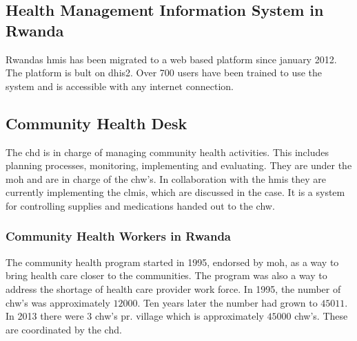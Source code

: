 \subsection{Health Management Information System in Rwanda}
Rwandas \gls{hmis} has been migrated to a web based platform since january 2012.
The platform is bult on \gls{dhis2}.
Over 700 users have been trained to use the system and is accessible with any internet connection. 
\cite{moh:rw}
\subsection{Community Health Desk}
The \gls{chd} is in charge of managing community health activities. 
This includes planning processes, monitoring, implementing and evaluating.
They are under the \gls{moh} and are in charge of the \gls{chw}'s.
In collaboration with the \gls{hmis} they are currently implementing the \gls{clmis}, which are discussed in the case. It is a system for controlling supplies and medications handed out to the \gls{chw}.
\cite{chd:strategy}


\subsubsection{Community Health Workers in Rwanda}
The community health program started in 1995, endorsed by \gls{moh}, as a way to bring health care closer to the communities. The program was also a way to address the shortage of health care provider work force. In 1995, the number of \gls{chw}'s was approximately $12000$. Ten years later the number had grown to $45011$. In 2013 there were 3 \gls{chw}'s pr. village which is approximately $45000$ \gls{chw}'s. These are coordinated by the \gls{chd}. 

